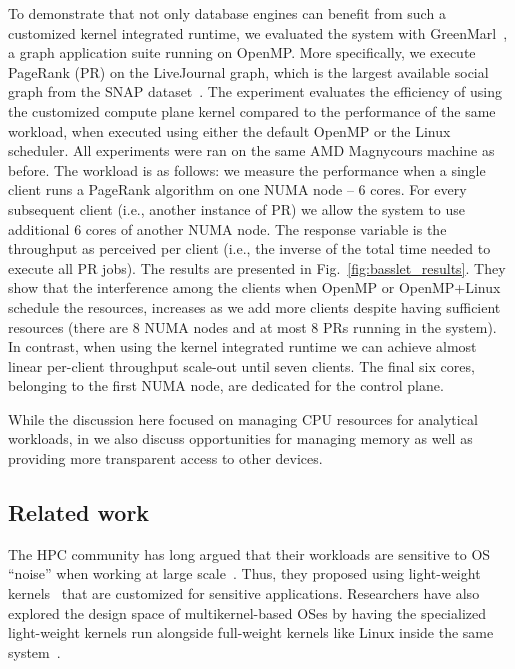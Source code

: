\documentclass[11pt]{article}
\begin{document}
To demonstrate that not only database engines can benefit from such a customized kernel
integrated runtime, we evaluated the system with GreenMarl~\cite{hong:asplos12}, a
graph application suite running on OpenMP. More specifically, we execute PageRank (PR) on the LiveJournal 
graph, which is the largest available social graph from the SNAP dataset~\cite{snapnets}. 
The experiment evaluates the efficiency of using the customized compute plane kernel 
compared to the performance of the same workload, when executed using either the 
default OpenMP or the Linux scheduler. All experiments were ran on the same 
AMD Magnycours machine as before. The workload is as follows: we measure the 
performance when a single client runs a PageRank algorithm on one NUMA node -- 
6 cores. For every subsequent client (i.e., another instance of PR) we allow
the system to use additional 6 cores of another NUMA node. The response variable
is the throughput as perceived per client (i.e., the inverse of the total time
needed to execute all PR jobs). The results are presented in Fig.~\ref{fig:basslet_results}.
They show that the interference among the clients when OpenMP or OpenMP+Linux 
schedule the resources, increases as we add more clients despite having sufficient
resources (there are 8 NUMA nodes and at most 8 PRs running in the system). 
In contrast, when using the kernel integrated runtime we can achieve almost linear 
per-client throughput scale-out until seven clients. The final six cores, belonging 
to the first NUMA node, are dedicated for the control plane.

While the discussion here focused on managing CPU resources for analytical
workloads, in \cite{Giceva:damon16} we also discuss opportunities for managing 
memory as well as providing more transparent access to other devices.

\subsection{Related work}
The HPC community has long argued that their workloads are
sensitive to OS ``noise'' when working at large scale~\cite{Hoefler:2010}.
Thus, they proposed using light-weight kernels~\cite{Riesen:2015,Kelly05,
Giampapa:2010} that are customized for sensitive applications. 
Researchers have also explored the design space of multikernel-based OSes by having the 
specialized light-weight kernels run alongside full-weight kernels like Linux inside the 
same system~\cite{FusedOS,mOS,Gerofi:2015}.
\end{document}

